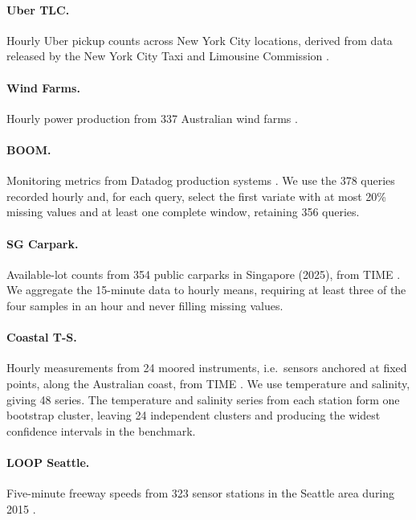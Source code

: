 \documentclass{article} %
\begin{document}
\paragraph{Uber TLC.}
Hourly Uber pickup counts across New York City locations, derived from data released by the
New York City Taxi and Limousine Commission
\citep{fivethirtyeight_uber_tlc,godahewa2021monashtimeseriesforecasting}.

\paragraph{Wind Farms.}
Hourly power production from 337 Australian wind farms
\citep{godahewa2021monashtimeseriesforecasting}. 

\paragraph{BOOM.}
Monitoring metrics from Datadog production systems
\citep{cohen2025timedifferentobservabilityperspective}. We use the 378 queries
recorded hourly and, for each query, select the first variate with at most 20\% missing values and at least one complete window, retaining 356 queries.

\paragraph{SG Carpark.}
Available-lot counts from 354 public carparks in Singapore (2025), from TIME
\citep{qiao2026itstimegenerationtime}. We aggregate the 15-minute data to hourly means,
requiring at least three of the four samples in an hour and never filling missing values.

\paragraph{Coastal T-S.}
Hourly measurements from 24 moored instruments, i.e.\ sensors anchored at fixed points, along
the Australian coast, from TIME \citep{qiao2026itstimegenerationtime}. We use temperature and salinity, giving 48 series. The temperature and salinity series from
each station form one bootstrap cluster, leaving 24 independent clusters and producing the widest confidence intervals in the benchmark.

\paragraph{LOOP Seattle.}
Five-minute freeway speeds from 323 sensor stations in the Seattle area during 2015 
\citep{cui2018deep,cui2019traffic}.
\end{document}
